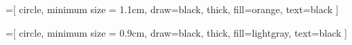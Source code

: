 
\usepackage{tikz}
\usetikzlibrary{graphs}
\usetikzlibrary{arrows.meta,arrows}

%
%

\newcommand{\drawinvisiblegraphline}{
    \draw [color=white]}

\newcommand{\drawgraphlinebigarrow}{
    \draw [-{Stealth[length=2mm,width=2mm]}]}

\newcommand{\drawgraphdashedlinebigarrow}{
    \draw [-{Stealth[length=2mm,width=2mm]},dashed]}

=[
    circle,
    minimum size = 1.1cm,
    draw=black,
    thick,
    fill=orange,
    text=black
]

=[
    circle,
    minimum size = 0.9cm,
    draw=black,
    thick,
    fill=lightgray,
    text=black
]